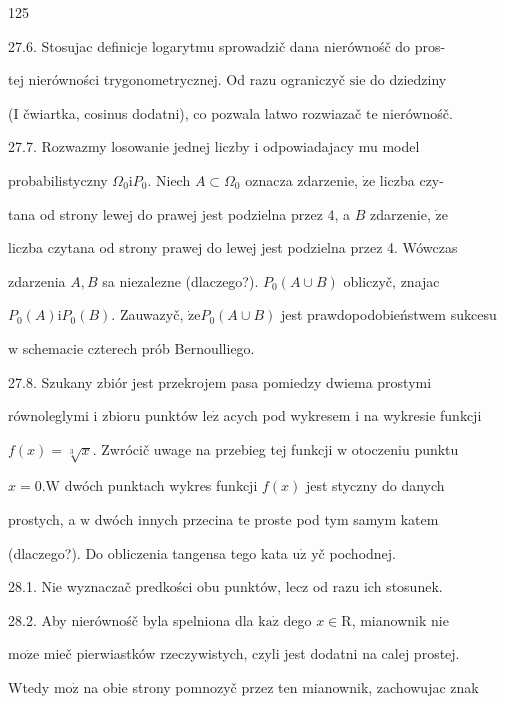 \documentclass[a4paper,12pt]{article}
\begin{document}
125

27.6. Stosujac definicje logarytmu sprowadzič dana nierównośč do pros-

tej nierówności trygonometrycznej. Od razu ograniczyč $\mathrm{s}\mathrm{i}\mathrm{e}$ do dziedziny

(I čwiartka, cosinus dodatni), co pozwala latwo rozwiazač $\mathrm{t}\mathrm{e}$ nierównośč.

27.7. Rozwazmy losowanie jednej liczby $\mathrm{i}$ odpowiadajacy mu model

probabilistyczny $\Omega_{0} \mathrm{i}P_{0}$. Niech $ A\subset \Omega_{0}$ oznacza zdarzenie, $\dot{\mathrm{z}}\mathrm{e}$ liczba czy-

tana od strony lewej do prawej jest podzielna przez 4, a $B$ zdarzenie, $\dot{\mathrm{z}}\mathrm{e}$

liczba czytana od strony prawej do lewej jest podzielna przez 4. Wówczas

zdarzenia $A, B$ sa niezalezne (dlaczego?). $P_{0}(A\cup B)$ obliczyč, znajac

$P_{0}(A)\mathrm{i}P_{0}(B)$. Zauwazyč, $\dot{\mathrm{z}}\mathrm{e}P_{0}(A\cup B)$ jest prawdopodobieństwem sukcesu

$\mathrm{w}$ schemacie czterech prób Bernoulliego.

27.8. Szukany zbiór jest przekrojem pasa pomiedzy dwiema prostymi

równoleglymi $\mathrm{i}$ zbioru punktów $\mathrm{l}\mathrm{e}\dot{\mathrm{z}}$ acych pod wykresem $\mathrm{i}$ na wykresie funkcji

$f(x) = \sqrt[3]{x}$. Zwrócič uwage na przebieg tej funkcji $\mathrm{w}$ otoczeniu punktu

$x = 0. \mathrm{W}$ dwóch punktach wykres funkcji $f(x)$ jest styczny do danych

prostych, a $\mathrm{w}$ dwóch innych przecina te proste pod tym samym katem

(dlaczego?). Do obliczenia tangensa tego kata $\mathrm{u}\dot{\mathrm{z}}$ yč pochodnej.

28.1. Nie wyznaczač predkości obu punktów, lecz od razu ich stosunek.

28.2. Aby nierównośč byla spelniona dla $\mathrm{k}\mathrm{a}\dot{\mathrm{z}}$ dego $x\in \mathrm{R}$, mianownik nie

$\mathrm{m}\mathrm{o}\dot{\mathrm{z}}\mathrm{e}$ mieč pierwiastków rzeczywistych, czyli jest dodatni na calej prostej.

Wtedy $\mathrm{m}\mathrm{o}\dot{\mathrm{z}}$ na obie strony pomnozyč przez ten mianownik, zachowujac znak
\end{document}
